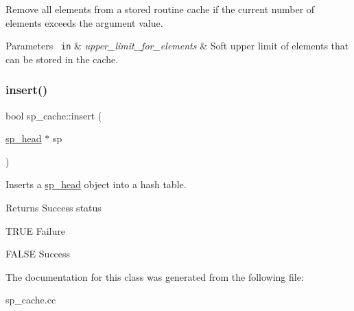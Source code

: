 Remove all elements from a stored routine cache if the current number of elements exceeds the argument value.


\begin{DoxyParams}[1]{Parameters}
\mbox{\texttt{ in}}  & {\em upper\+\_\+limit\+\_\+for\+\_\+elements} & Soft upper limit of elements that can be stored in the cache. \\
\hline
\end{DoxyParams}
\mbox{\label{classsp__cache_a1271ecde8fa8f445cc6d243b2e8bef5c}} 
\subsubsection{\texorpdfstring{insert()}{insert()}}
{\footnotesize\ttfamily bool sp\+\_\+cache\+::insert (\begin{DoxyParamCaption}\item[{\mbox{\hyperlink{classsp__head}{sp\+\_\+head}} $\ast$}]{sp }\end{DoxyParamCaption})\hspace{0.3cm}{\ttfamily [inline]}}

Inserts a \mbox{\hyperlink{classsp__head}{sp\+\_\+head}} object into a hash table.

\begin{DoxyReturn}{Returns}
Success status 

T\+R\+UE Failure 

F\+A\+L\+SE Success 
\end{DoxyReturn}


The documentation for this class was generated from the following file\+:\begin{DoxyCompactItemize}
\item 
sp\+\_\+cache.\+cc\end{DoxyCompactItemize}
